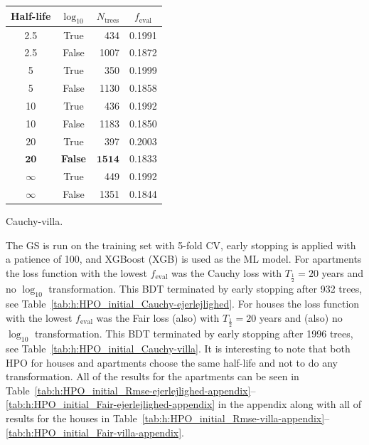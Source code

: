 \begin{margintable}
  \begin{tabular}{@{}ccrc@{}}
    Half-life & $\log_{10}$ & $N_\mathrm{trees}$ & $f_\mathrm{eval}$ \\
    \midrule
    \num{2.5} & True & \num{434} & \num{0.1991} \\
    \num{2.5} & False & \num{1007} & \num{0.1872} \\
    \num{5} & True & \num{350} & \num{0.1999} \\
    \num{5} & False & \num{1130} & \num{0.1858} \\
    \num{10} & True & \num{436} & \num{0.1992} \\
    \num{10} & False & \num{1183} & \num{0.1850} \\
    \num{20} & True & \num{397} & \num{0.2003} \\
    $\mathbf{20}$ & \textbf{False} & $\mathbf{1514}$ & $\mathbf{0.1833}$ \\
    $\infty$ & True & \num{449} & \num{0.1992} \\
    $\infty$ & False & \num{1351} & \num{0.1844} \\
  \end{tabular}
  \caption{\label{tab:h:HPO_initial_Cauchy-villa}Cauchy-villa.}
\end{margintable}




The GS is run on the training set with \num{5}-fold CV, early stopping is applied with a patience of \num{100}, and XGBoost \autocite{chenXGBoostScalableTree2016} (XGB) is used as the ML model. For apartments the loss function with the lowest $f_\mathrm{eval}$ was the Cauchy loss with $T_{\frac{1}{2}}=20$ years and no $\log_{10}$ transformation. This BDT terminated by early stopping after \num{932} trees, see Table~\ref{tab:h:HPO_initial_Cauchy-ejerlejlighed}. 
For houses the loss function with the lowest $f_\mathrm{eval}$ was the Fair loss (also) with $T_{\frac{1}{2}}=20$ years and (also) no $\log_{10}$ transformation. This BDT terminated by early stopping after \num{1996} trees, see Table~\ref{tab:h:HPO_initial_Cauchy-villa}. 
It is interesting to note that both HPO for houses and apartments choose the same half-life and not to do any transformation. All of the results for the apartments can be seen in Table~\ref{tab:h:HPO_initial_Rmse-ejerlejlighed-appendix}--\ref{tab:h:HPO_initial_Fair-ejerlejlighed-appendix} in the appendix along with all of results for the houses in Table~\ref{tab:h:HPO_initial_Rmse-villa-appendix}--\ref{tab:h:HPO_initial_Fair-villa-appendix}. 

